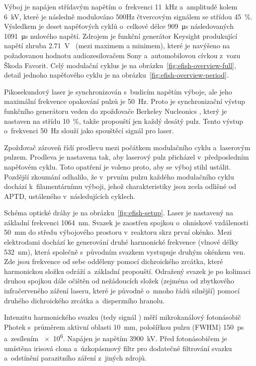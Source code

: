 Výboj je napájen střídavým napětím o~frekvenci \SI{11}{\kilo\hertz}
a~amplitudě kolem \SI{6}{\kilo\volt},
které je následně modulováno \num{500}\si{\hertz} čtvercovým signálem
se střídou \SI{45}{\percent}.
Výsledkem je deset napěťových cyklů o~celkové délce \SI{909}{\micro\second}
následovaných \SI{1091}{\micro\second} nulového napětí.
\autocite{efish-nitrogen}
Zdrojem je funkční generátor Keysight 
produkující napětí zhruba \SI{2.71}{\volt\peaktopeak} (mezi maximem a minimem),
které je navýšeno na požadovanou hodnotu audiozesilovačem
Sony  a~automobilovou cívkou z~vozu Škoda Favorit.
Celý modulační cyklus je na obrázku~\ref{fig:efish-overview-full},
detail jednoho napěťového cyklu je na obrázku~\ref{fig:efish-overview-period}.

Pikosekundový laser je synchronizován s~budicím napětím výboje,
ale jeho maximální frekvence opakování pulzů je \SI{50}{\hertz}.
Proto je synchronizační výstup funkčního generátoru veden do zpožďovače
Berkeley Nucleonics ,
který je nastaven na střídu \SI{10}{\percent},
takže propouští jen každý desátý pulz.
Tento výstup o~frekvenci \SI{50}{\hertz} slouží jako spouštěcí signál
pro laser.

Zpožďovač zároveň řídí prodlevu mezi počátkem modulačního cyklu
a~laserovým pulzem.
Prodleva je nastavena tak, aby laserový pulz přicházel v~předposledním
napěťovém cyklu.
Toto opatření je voleno proto, aby se výboj stihl ustálit.
Pozdější zkoumání odhalilo, že v~prvním pulzu každého modulačního cyklu
dochází k~filamentárnímu výboji, jehož charakteristiky jsou zcela odlišné
od APTD, ustáleného v~následujících cyklech.

Schéma optické dráhy je na obrázku~\ref{fig:efish-setup}.
Laser je nastavený na základní frekvenci \SI{1064}{\nano\metre}.
Svazek je zaostřen spojkou o~ohniskové vzdálenosti \SI{50}{\milli\metre}
do středu výbojového prostoru v~reaktoru skrz první okénko.
Mezi elektrodami dochází ke generování druhé harmonické frekvence
(vlnové délky \SI{532}{\nano\metre}), která společně s~původním svazkem
vystupuje druhým okénkem ven.
Zde jsou frekvence od sebe odděleny pomocí dichroického zrcátka,
které harmonickou složku odráží a~základní propouští.
Odražený svazek je po kolimaci druhou spojkou dále očištěn od nežádoucích
složek (zejména od zbytkového infračerveného záření laseru,
které je původně o~mnoho řádů silnější)
pomocí druhého dichroického zrcátka a~disperzního hranolu.

Intenzitu harmonického svazku (tedy signál \EFISH{})
měří mikrokanálový fotonásobič
Photek  s~průměrem aktivní oblasti \SI{10}{\milli\metre},
pološířkou pulzu (FWHM) \SI{150}{\pico\second} a~zesílením \num{e6}.
Napájen je napětím \SI{3900}{\kilo\volt}.
Před fotonásobičem je umístěna irisová clona a~úzkopásmový filtr
pro dodatečné filtrování svazku a~odstínění parazitního záření
z~jiných zdrojů.

